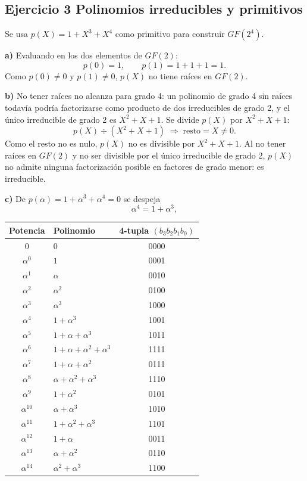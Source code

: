 \documentclass[11pt]{article}
\begin{document}
\subsection*{Ejercicio 3 Polinomios irreducibles y primitivos}

Se usa $p(X) = 1+X^3+X^4$ como primitivo para construir $GF(2^4)$.

\textbf{a)} Evaluando en los dos elementos de $GF(2)$:
$$p(0) = 1, \qquad p(1) = 1+1+1 = 1.$$
Como $p(0)\neq 0$ y $p(1)\neq 0$, $p(X)$ no tiene raíces en $GF(2)$.

\textbf{b)} No tener raíces no alcanza para grado 4: un polinomio de
grado 4 sin raíces todavía podría factorizarse como producto de dos irreducibles de grado 2,
y el único irreducible de grado 2 es $X^2+X+1$. Se divide $p(X)$ por $X^2+X+1$:
$$p(X) \div (X^2+X+1) \;\Rightarrow\; \text{resto} = X \neq 0.$$
Como el resto no es nulo, $p(X)$ no es divisible por $X^2+X+1$. Al no tener raíces en $GF(2)$
y no ser divisible por el único irreducible de grado 2, $p(X)$ no admite ninguna
factorización posible en factores de grado menor: es irreducible. 

\textbf{c)} De $p(\alpha)=1+\alpha^3+\alpha^4=0$ se despeja
$$\alpha^4 = 1+\alpha^3,$$
\newpage
\begin{table}[h]
\centering
\renewcommand{\arraystretch}{1.15}
\begin{tabular}{c l c}
\toprule
Potencia & Polinomio & 4-tupla $(b_3b_2b_1b_0)$ \\
\midrule
$0$            & $0$                             & 0000 \\
$\alpha^{0}$   & $1$                             & 0001 \\
$\alpha^{1}$   & $\alpha$                        & 0010 \\
$\alpha^{2}$   & $\alpha^2$                      & 0100 \\
$\alpha^{3}$   & $\alpha^3$                      & 1000 \\
$\alpha^{4}$   & $1+\alpha^3$                    & 1001 \\
$\alpha^{5}$   & $1+\alpha+\alpha^3$             & 1011 \\
$\alpha^{6}$   & $1+\alpha+\alpha^2+\alpha^3$    & 1111 \\
$\alpha^{7}$   & $1+\alpha+\alpha^2$             & 0111 \\
$\alpha^{8}$   & $\alpha+\alpha^2+\alpha^3$      & 1110 \\
$\alpha^{9}$   & $1+\alpha^2$                    & 0101 \\
$\alpha^{10}$  & $\alpha+\alpha^3$               & 1010 \\
$\alpha^{11}$  & $1+\alpha^2+\alpha^3$           & 1101 \\
$\alpha^{12}$  & $1+\alpha$                      & 0011 \\
$\alpha^{13}$  & $\alpha+\alpha^2$               & 0110 \\
$\alpha^{14}$  & $\alpha^2+\alpha^3$             & 1100 \\
\bottomrule
\end{tabular}
\label{tab:gf16}
\end{table}
\end{document}
